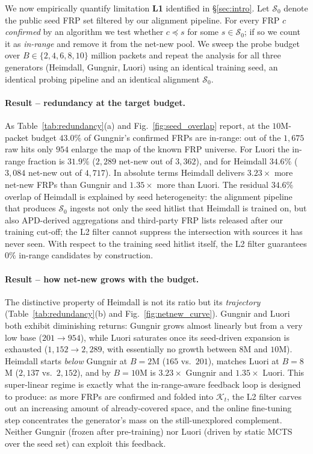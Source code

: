 \documentclass[conference]{IEEEtran}
\begin{document}
We now empirically quantify limitation \textbf{L1} identified in
\S\ref{sec:intro}.  Let $\mathcal{S}_{0}$ denote the public seed FRP
set filtered by our alignment pipeline.  For every FRP $c$
\emph{confirmed} by an algorithm we test whether
$c\preceq s$ for some $s\in\mathcal{S}_{0}$; if so we count it as
\emph{in-range} and remove it from the net-new pool.  We sweep the
probe budget over $B\in\{2,4,6,8,10\}$ million packets and repeat
the analysis for all three generators (Heimdall, Gungnir, Luori) using
an identical training seed, an identical probing pipeline and an
identical alignment $\mathcal{S}_{0}$.

\paragraph{Result -- redundancy at the target budget.}  As
Table~\ref{tab:redundancy}(a) and Fig.~\ref{fig:seed_overlap}
report, at the $10$M-packet budget $43.0\%$ of Gungnir's
confirmed FRPs are in-range: out of the $1{,}675$ raw hits only
$954$ enlarge the map of the known FRP universe.  For Luori the
in-range fraction is $31.9\%$ ($2{,}289$ net-new out of $3{,}362$),
and for Heimdall $34.6\%$ ($3{,}084$ net-new out of $4{,}717$).  In
absolute terms Heimdall delivers $3.23\times$ more net-new FRPs than
Gungnir and $1.35\times$ more than Luori.
The residual $34.6\%$ overlap of Heimdall is explained by seed
heterogeneity: the alignment pipeline that produces
$\mathcal{S}_{0}$ ingests not only the seed hitlist that Heimdall is
trained on, but also APD-derived aggregations and third-party FRP
lists released after our training cut-off; the L2 filter cannot
suppress the intersection with sources it has never seen.  With
respect to the training seed hitlist itself, the L2 filter
guarantees $0\%$ in-range candidates by construction.

\paragraph{Result -- how net-new grows with the budget.}  The
distinctive property of Heimdall is not its ratio but its
\emph{trajectory} (Table~\ref{tab:redundancy}(b) and
Fig.~\ref{fig:netnew_curve}).  Gungnir and Luori both exhibit
diminishing returns: Gungnir grows almost linearly but from a very
low base ($201\!\to\!954$), while Luori saturates once its
seed-driven expansion is exhausted ($1{,}152\!\to\!2{,}289$, with
essentially no growth between $8$M and $10$M).  Heimdall starts
\emph{below} Gungnir at $B\!=\!2$M ($165$ vs.\ $201$), matches
Luori at $B\!=\!8$M ($2{,}137$ vs.\ $2{,}152$), and by $B\!=\!10$M
is $3.23\times$ Gungnir and $1.35\times$ Luori.  This super-linear
regime is exactly what the in-range-aware feedback loop is
designed to produce: as more FRPs are confirmed and folded into
$\mathcal{K}_t$, the L2 filter carves out an increasing amount of
already-covered space, and the online fine-tuning step
concentrates the generator's mass on the still-unexplored
complement.  Neither Gungnir (frozen after pre-training) nor Luori
(driven by static MCTS over the seed set) can exploit this
feedback.
\end{document}

